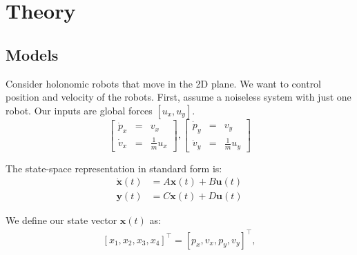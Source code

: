 \section{Theory}
\label{sec:theory}


\subsection{Models}
Consider holonomic robots that move in the 2D plane. We want to control position and velocity of the robots. 
First, assume a noiseless system with just one robot.
 Our inputs are global forces $[u_x,u_y]$. \begin{equation}
\begin{bmatrix}
\dot{p}_x &=& v_x \\
\dot{v}_x &=& \frac{1}{m} u_x
\end{bmatrix},
\begin{bmatrix}
\dot{p}_y &=& v_y \\
\dot{v}_y &=&\frac{1}{m} u_y
\end{bmatrix}
\end{equation}

The state-space representation in standard form is: 
\begin{align}\label{eq:stdform}
\dot{\mathbf{x}}(t)  &=  A \mathbf{x}(t) + B \mathbf{u}(t) \\
\mathbf{y}(t) &= C \mathbf{x}(t) + D \mathbf{u}(t)\nonumber 
\end{align}


We define our state vector $\mathbf{x}(t)$ as:
\begin{align}
\left[ x_1,x_2,x_3,x_4\right]^\intercal = \left[ p_x,v_x,p_y,v_y\right]^\intercal, \nonumber
\end{align}

